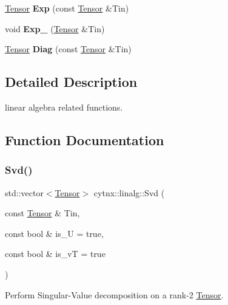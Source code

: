 \begin{DoxyCompactItemize}
\hyperlink{classcytnx_1_1Tensor}{Tensor} {\bfseries Exp} (const \hyperlink{classcytnx_1_1Tensor}{Tensor} \&Tin)
\item 
\mbox{\label{namespacecytnx_1_1linalg_aaab08439dde94ee87939d07933ede6e3}} 
void {\bfseries Exp\+\_\+} (\hyperlink{classcytnx_1_1Tensor}{Tensor} \&Tin)
\item 
\mbox{\label{namespacecytnx_1_1linalg_a5913f0bdd6cc130aeb927f42a874a149}} 
\hyperlink{classcytnx_1_1Tensor}{Tensor} {\bfseries Diag} (const \hyperlink{classcytnx_1_1Tensor}{Tensor} \&Tin)
\end{DoxyCompactItemize}


\subsection{Detailed Description}
linear algebra related functions. 

\subsection{Function Documentation}
\mbox{\label{namespacecytnx_1_1linalg_ac17f16959a4849ea91bce712d24d4e4e}} 
\subsubsection{\texorpdfstring{Svd()}{Svd()}}
{\footnotesize\ttfamily std\+::vector$<$\hyperlink{classcytnx_1_1Tensor}{Tensor}$>$ cytnx\+::linalg\+::\+Svd (\begin{DoxyParamCaption}\item[{const \hyperlink{classcytnx_1_1Tensor}{Tensor} \&}]{Tin,  }\item[{const bool \&}]{is\+\_\+U = {\ttfamily true},  }\item[{const bool \&}]{is\+\_\+vT = {\ttfamily true} }\end{DoxyParamCaption})}



Perform Singular-\/\+Value decomposition on a rank-\/2 \hyperlink{classcytnx_1_1Tensor}{Tensor}. 


